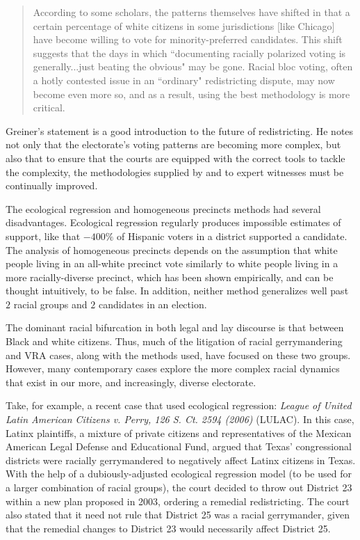 \begin{quote}
 According to some scholars, the patterns themselves have shifted in that a certain percentage of white citizens in some jurisdictions [like Chicago] have become willing to vote for minority-preferred candidates. This shift suggests that the days in which ``documenting racially polarized voting is generally...just beating the obvious" may be gone. Racial bloc voting, often a hotly contested issue in an ``ordinary" redistricting dispute, may now become even more so, and as a result, using the best methodology is more critical.\cite{greiner}
\end{quote}

Greiner's statement is a good introduction to the future of redistricting. He notes not only that the electorate's voting patterns are becoming more complex, but also that to ensure that the courts are equipped with the correct tools to tackle the complexity, the methodologies supplied by and to expert witnesses must be continually improved.

The ecological regression and homogeneous precincts methods had several disadvantages. Ecological regression regularly produces impossible estimates of support, like that $-400\%$ of Hispanic voters in a district supported a candidate. The analysis of homogeneous precincts depends on the assumption that white people living in an all-white precinct vote similarly to white people living in a more racially-diverse precinct, which has been shown empirically, and can be thought intuitively, to be false.\cite{greiner} In addition, neither method generalizes well past $2$ racial groups and $2$ candidates in an election.

The dominant racial bifurcation in both legal and lay discourse is that between Black and white citizens. Thus, much of the litigation of racial gerrymandering and VRA cases, along with the methods used, have focused on these two groups. However, many contemporary cases explore the more complex racial dynamics that exist in our more, and increasingly, diverse electorate.

Take, for example, a recent case that used ecological regression: \textit{League of United Latin American Citizens v. Perry, 126 S. Ct. 2594 (2006)} (LULAC). In this case, Latinx plaintiffs, a mixture of private citizens and representatives of the Mexican American Legal Defense and Educational Fund, argued that Texas' congressional districts were racially gerrymandered to negatively affect Latinx citizens in Texas. With the help of a dubiously-adjusted ecological regression model (to be used for a larger combination of racial groups), the court decided to throw out District 23 within a new plan proposed in 2003, ordering a remedial redistricting.\cite{LULAC} The court also stated that it need not rule that District 25 was a racial gerrymander, given that the remedial changes to District 23 would necessarily affect District 25.

